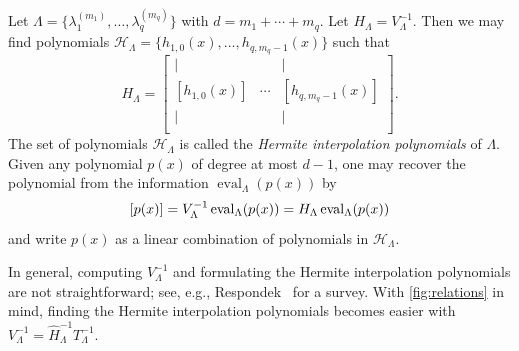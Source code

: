 \documentclass{article}
\theoremstyle{definition}
\newcommand{\eval}{\operatorname{eval}}
\begin{document}
Let $\Lambda = \{\lambda_1^{(m_1)}, \ldots, \lambda_q^{(m_q)}\}$ with $d = m_1 + \cdots + m_q$.  Let $H_\Lambda = V_\Lambda^{-1}$.  Then we may find polynomials $\mathcal{H}_\Lambda = \{h_{1,0}(x), \ldots, h_{q,m_q-1}(x)\}$ such that 
\[
    H_\Lambda = \begin{bmatrix}
        | & ~ & | \\
        [h_{1,0}(x)] & \cdots & [h_{q,m_q-1}(x)] \\
        | & ~ & | \\
    \end{bmatrix}.
\]
The set of polynomials $\mathcal{H}_\Lambda$ is called the \emph{Hermite interpolation polynomials} of $\Lambda$.  Given any polynomial $p(x)$ of degree at most $d-1$, one may recover the polynomial from the information $\eval_\Lambda(p(x))$ by  
\[
    \relax[p(x)] = V_\Lambda^{-1} \eval_\Lambda(p(x)) = H_\Lambda \eval_\Lambda(p(x))
\]
and write $p(x)$ as a linear combination of polynomials in $\mathcal{H}_\Lambda$.

In general, computing $V_\Lambda^{-1}$ and formulating the Hermite interpolation polynomials are not straightforward; see, e.g., Respondek~\cite{Respondek24} for a survey.  With \cref{fig:relations} in mind, finding the Hermite interpolation polynomials becomes easier with $V_\Lambda^{-1} = \hat{H}_\Lambda^{-1} T_\Lambda^{-1}$.
\end{document}
